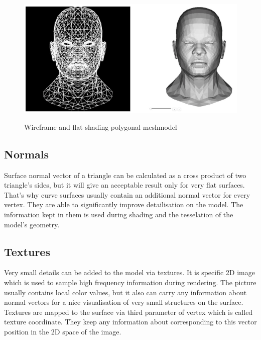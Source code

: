 \documentclass[twoside, english, 11pt]{report}
\begin{document}
\begin{figure}[!h]
\includegraphics[scale=0.55]{img/mesh}\\
\caption{Wireframe and flat shading polygonal meshmodel\label{fig:mesh}}
\end{figure}

\subsection{Normals}
Surface normal vector of a triangle can be calculated as a cross product of two triangle's sides, but it will give an acceptable result only for very flat surfaces. That's why curve surfaces usually contain an additional normal vector for every vertex. They are able to significantly improve detailisation on the model. The information kept in them is used during shading and the tesselation of the model's geometry.\\


\subsection{Textures}
Very small details can be added to the model via textures. It is specific 2D image which is used to sample high frequency information during rendering. The picture usually contains local color values, but it also can carry any information about normal vectors for a nice visualisation of very small structures on the surface. Textures are mapped to the surface via third parameter of vertex which is called texture coordinate. They keep any information about corresponding to this vector position in the 2D space of the image.\\

\end{document}
